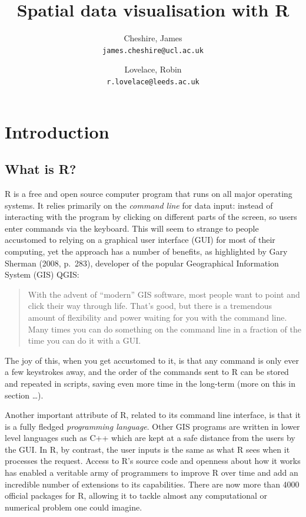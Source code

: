 \documentclass[]{article}
\author{
Cheshire, James\\
\texttt{james.cheshire@ucl.ac.uk}
\and
Lovelace, Robin\\
\texttt{r.lovelace@leeds.ac.uk}
}
\title{Spatial data visualisation with R}
\begin{document}
\maketitle

\section{Introduction}

\subsection{What is R?}

R is a free and open source computer program that runs on all major
operating systems. It relies primarily on the \emph{command line} for
data input: instead of interacting with the program by clicking on
different parts of the screen, so users enter commands via the keyboard.
This will seem to strange to people accustomed to relying on a graphical
user interface (GUI) for most of their computing, yet the approach has a
number of benefits, as highlighted by Gary Sherman (2008, p.~283),
developer of the popular Geographical Information System (GIS) QGIS:

\begin{quote}
With the advent of ``modern'' GIS software, most people want to point
and click their way through life. That's good, but there is a tremendous
amount of flexibility and power waiting for you with the command line.
Many times you can do something on the command line in a fraction of the
time you can do it with a GUI.

\end{quote}
The joy of this, when you get accustomed to it, is that any command is
only ever a few keystrokes away, and the order of the commands sent to R
can be stored and repeated in scripts, saving even more time in the
long-term (more on this in section \ldots{}).

Another important attribute of R, related to its command line interface,
is that it is a fully fledged \emph{programming language}. Other GIS
programs are written in lower level languages such as C++ which are kept
at a safe distance from the users by the GUI. In R, by contrast, the
user inputs is the same as what R sees when it processes the request.
Access to R's source code and openness about how it works has enabled a
veritable army of programmers to improve R over time and add an
incredible number of extensions to its capabilities. There are now more
than 4000 official packages for R, allowing it to tackle almost any
computational or numerical problem one could imagine.
\end{document}
